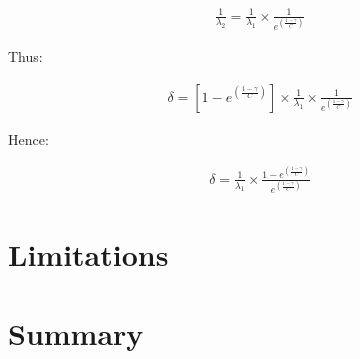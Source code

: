     \begin{equation}
		     \begin{aligned}
		         \frac{1}{\lambda_2} = \frac{1}{\lambda_1} \times \frac{1}{e ^{ ({\frac{1-\gamma}{C}})}}
		     \end{aligned}
    \end{equation}
    
    Thus:
    
     \begin{equation}
		     \begin{aligned}
		         \delta = [1 - e ^{ ({\frac{1-\gamma}{C}})}] \times \frac{1}{\lambda_1} \times \frac{1}{e ^{ ({\frac{1-\gamma}{C}})}}
		     \end{aligned}
    \end{equation}
    
    Hence:
    
        \begin{equation}
		     \begin{aligned}
		         \delta = \frac{1}{\lambda_1}  \times   \frac{1 - e ^{ ({\frac{1-\gamma}{C}})}}{e ^{ ({\frac{1-\gamma}{C}})}}
		     \end{aligned}
    \end{equation}
    
\section{Limitations}

\section{Summary}